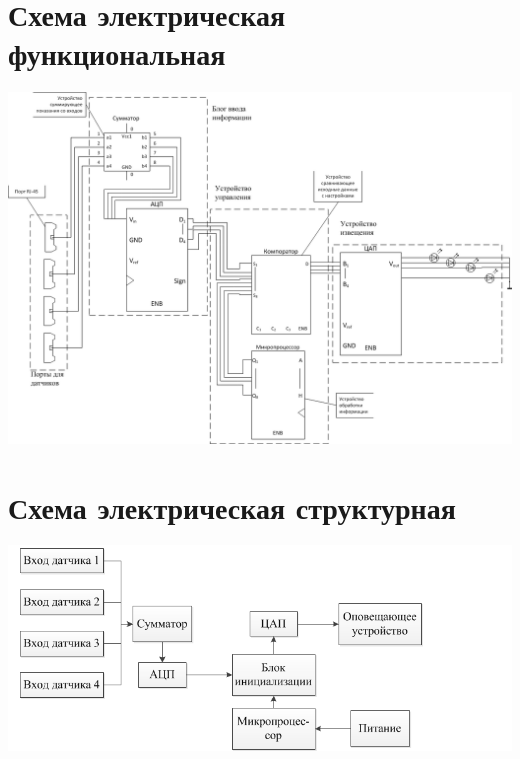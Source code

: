 	\section{Схема электрическая функциональная}
	\begin{center}
		\includegraphics[width=170mm]{src/pictures/schemep1.png}
	\end{center}
	\section{Схема электрическая структурная}
	\begin{center}
		\includegraphics[width=170mm]{src/pictures/schemep2.png}
	\end{center}
